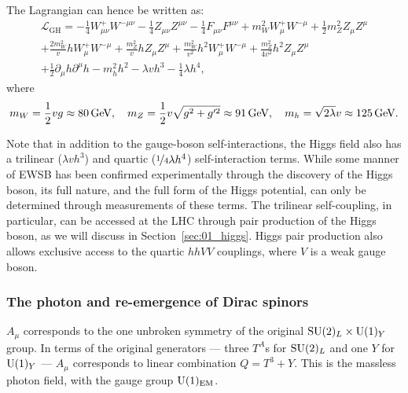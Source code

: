 The Lagrangian can hence be written as:
\begin{multline}
	\label{eq:01_sm_ew_gauge_lagrangian_weinberg}
		\mathcal{L}_{\mathrm{GH}} = -\frac{1}{4} W^+_{\mu\nu} W^{-\mu\nu} - \frac{1}{4} Z_{\mu\nu} Z^{\mu\nu} - \frac{1}{4} F_{\mu\nu} F^{\mu\nu}
		+  m_W^2 W^+_\mu W^{-\mu} + \frac{1}{2} m_Z^2 Z_\mu Z^\mu \\
		+ \frac{2 m_W^2}{v} h W^+_\mu W^{-\mu} + \frac{m_Z^2}{v} h Z_\mu Z^\mu + \frac{m_W^2}{v^2} h^2 W^+_\mu W^{-\mu} + \frac{m_Z^2}{4v^2} h^2 Z_\mu Z^\mu \\
		+ \frac{1}{2}\partial_\mu h \partial^\mu h - m_h^2 h^2 - \lambda v h^3 - \frac{1}{4} \lambda h^4,
\end{multline}
where
\begin{equation}
	\label{eq:01_sm_ew_masses}
	m_W = \frac{1}{2} vg \approx 80 \,\text{Ge\hspace{-.08em}V}, \quad m_Z = \frac{1}{2} v \sqrt{g^2 + g'^2} \approx 91 \,\text{Ge\hspace{-.08em}V}, \quad m_h = \sqrt{2\lambda} v \approx 125 \,\text{Ge\hspace{-.08em}V}.
\end{equation}

Note that in addition to the gauge-boson self-interactions, the Higgs field also has a trilinear ($\lambda v h^3$) and quartic ($\cnicefrac{1}{4} \lambda h^4$) self-interaction terms.
While some manner of EWSB has been confirmed experimentally through the discovery of the Higgs boson, its full nature, and the full form of the Higgs potential, can only be determined through measurements of these terms.
The trilinear self-coupling, in particular, can be accessed at the LHC through pair production of the Higgs boson, as we will discuss in Section~\ref{sec:01_higgs}.
Higgs pair production also allows exclusive access to the quartic $hhVV$ couplings, where $V$ is a weak gauge boson.

\subsubsection{The photon and re-emergence of Dirac spinors}

$A_\mu$ corresponds to the one unbroken symmetry of the original $\SU[2]_L \times \UU[1]_Y$ group.
In terms of the original generators --- three $T^A$s for $\SU[2]_L$ and one $Y$ for $\UU[1]_Y$ --- $A_\mu$ corresponds to linear combination $Q = T^3 + Y$.
This is the massless photon field, with the gauge group $\UU[1]_{\mathrm{EM}}$.

